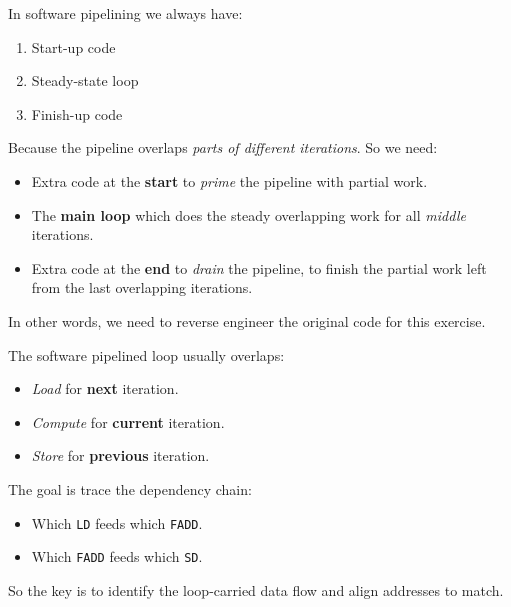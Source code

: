 \highspace
In software pipelining we always have:
\begin{enumerate}
    \item Start-up code
    \item Steady-state loop
    \item Finish-up code
\end{enumerate}
Because the pipeline overlaps \emph{parts of different iterations}. So we need:
\begin{itemize}
    \item Extra code at the \textbf{start} to \emph{prime} the pipeline with partial work.
    \item The \textbf{main loop} which does the steady overlapping work for all \emph{middle} iterations.
    \item Extra code at the \textbf{end} to \emph{drain} the pipeline, to finish the partial work left from the last overlapping iterations.
\end{itemize}
In other words, we need to reverse engineer the original code for this exercise.

\highspace
The software pipelined loop usually overlaps:
\begin{itemize}
    \item \emph{Load} for \textbf{next} iteration.
    \item \emph{Compute} for \textbf{current} iteration.
    \item \emph{Store} for \textbf{previous} iteration.
\end{itemize}
The goal is trace the dependency chain:
\begin{itemize}
    \item Which \texttt{LD} feeds which \texttt{FADD}.
    \item Which \texttt{FADD} feeds which \texttt{SD}.
\end{itemize}
So the key is to identify the loop-carried data flow and align addresses to match.

